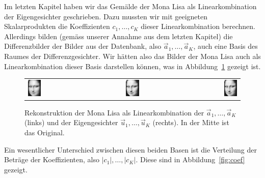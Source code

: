 Im letzten Kapitel haben wir das Gemälde der Mona Lisa als Linearkombination der Eigengesichter geschrieben.
Dazu mussten wir mit geeigneten Skalarprodukten die Koeffizienten $c_1,\ldots,c_K$ dieser Linearkombination berechnen.
Allerdings bilden (gemäss unserer Annahme aus dem letzten Kapitel) die Differenzbilder der Bilder aus der Datenbank, also $\vec a_1,\ldots,\vec a_K$, auch eine Basis des Raumes der Differenzgesichter.
Wir hätten also das Bilder der Mona Lisa auch als Linearkombination dieser Basis darstellen können, was in Abbildung~\ref{fig:mona_lisa_reconstruction} gezeigt ist.
\begin{figure}[ht]
	\centering
	\begin{tabular}{lcr}
		\includegraphics[width=0.2\textwidth]{images/eigenfaces/mona_lisa_naive_approx} &
		\includegraphics[width=0.2\textwidth]{images/eigenfaces/mona_lisa_original} & \includegraphics[width=0.2\textwidth]{images/eigenfaces/mona_lisa_eigen_approx}
	\end{tabular}
	\caption{Rekonstruktion der Mona Lisa als Linearkombination der $\vec a_1,\ldots,\vec a_K$ (links) und der Eigengesichter $\vec u_1,\ldots,\vec u_K$ (rechts). In der Mitte ist das Original.}
	\label{fig:mona_lisa_reconstruction}
\end{figure}
Ein wesentlicher Unterschied zwischen diesen beiden Basen ist die Verteilung der Beträge der Koeffizienten, also $\lvert c_1\rvert,\ldots,\lvert c_K\rvert$.
Diese sind in Abbildung~\ref{fig:coef} gezeigt.

